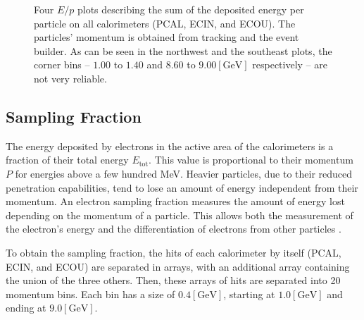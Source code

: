     \begin{figure}[b!]
        \centering{}
        \caption[Calorimeters $E/p$ plots]{Four $E/p$ plots describing the sum of the deposited energy per particle on all calorimeters (PCAL, ECIN, and ECOU). The particles' momentum is obtained from tracking and the event builder. As can be seen in the northwest and the southeast plots, the corner bins -- $1.00$ to $1.40$ and $8.60$ to $9.00 [\text{GeV}]$ respectively -- are not very reliable.}
        \label{fig::sf_1d}
    \end{figure}

\subsection{Sampling Fraction} \label{ssec::sampling_fraction}
    The energy deposited by electrons in the active area of the calorimeters is a fraction of their total energy $E_\text{tot}$.
    This value is proportional to their momentum $P$ for energies above a few hundred MeV.
    Heavier particles, due to their reduced penetration capabilities, tend to lose an amount of energy independent from their momentum.
    An electron sampling fraction measures the amount of energy lost depending on the momentum of a particle.
    This allows both the measurement of the electron's energy and the differentiation of electrons from other particles \cite{wigmans2000}.

    To obtain the sampling fraction, the hits of each calorimeter by itself (PCAL, ECIN, and ECOU) are separated in arrays, with an additional array containing the union of the three others.
    Then, these arrays of hits are separated into 20 momentum bins.
    Each bin has a size of $0.4 [\text{GeV}]$, starting at $1.0 [\text{GeV}]$ and ending at $9.0 [\text{GeV}]$.

